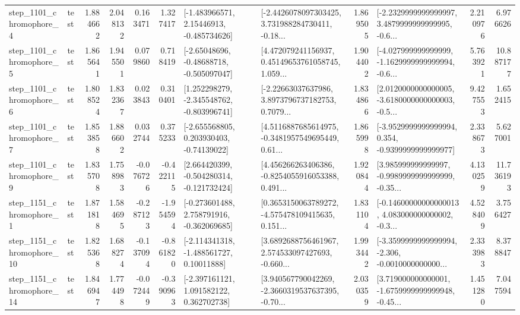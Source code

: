 \begin{tabular}{llrrrrllrlrr}
  step\_1101\_chromophore\_4 &      test &      1.884662 &    2.048132 &      0.163471 &  1.327417 &    [-1.483966571, 2.15446913, -0.485734626] &  [-2.4426078097303425, 3.731988284730411, -0.18... &       1.869505 &  [-2.2329999999999997, 3.4879999999999995, -0.6... &            2.210976 &          6.976626 \\
  step\_1101\_chromophore\_5 &      test &      1.865641 &    1.945501 &      0.079860 &  0.718419 &    [-2.65048696, -0.48688718, -0.505097047] &  [4.472079241156937, 0.45149653761058745, 1.059... &       1.904402 &  [-4.027999999999999, -1.1629999999999994, -0.6... &            5.763921 &         10.887177 \\
  step\_1101\_chromophore\_6 &      test &      1.808524 &    1.832367 &      0.023843 &  0.310401 &   [1.252298279, -2.345548762, -0.803996741] &  [-2.22663037637986, 3.8973796737182753, 0.7079... &       1.834866 &  [2.0120000000000005, -3.6180000000000003, -0.5... &            9.427553 &          1.652415 \\
  step\_1101\_chromophore\_7 &      test &      1.853858 &    1.886602 &      0.032744 &  0.375233 &    [-2.655568805, 0.203930403, -0.74139022] &  [4.5116887685614975, -0.3481957549695449, 0.61... &       1.865998 &  [-3.9529999999999994, 0.354, -0.9399999999999977] &            2.338673 &          5.627001 \\
  step\_1101\_chromophore\_9 &      test &      1.835708 &    1.758983 &     -0.076726 & -0.422115 &   [2.664420399, -0.504280314, -0.121732424] &  [4.456266263406386, -0.8254055916053388, 0.491... &       1.920844 &  [3.985999999999997, -0.9989999999999999, -0.35... &            4.130259 &         11.736193 \\
  step\_1151\_chromophore\_1 &      test &      1.871818 &    1.584695 &     -0.287123 & -1.954594 &   [-0.273601488, 2.758791916, -0.362069685] &  [0.3653150063789272, -4.575478109415635, 0.151... &       1.831104 &  [-0.14600000000000013, 4.083000000000002, -0.3... &            4.528409 &          3.756427 \\
 step\_1151\_chromophore\_10 &      test &      1.825368 &    1.688274 &     -0.137094 & -0.861820 &    [-2.114341318, -1.488561727, 0.10011888] &  [3.6892688756461967, 2.574533097427693, -0.660... &       1.993442 &  [-3.3599999999999994, -2.306, -0.0010000000000... &            2.333983 &          8.378847 \\
 step\_1151\_chromophore\_14 &      test &      1.846947 &    1.774498 &     -0.072449 & -0.390963 &    [-2.397161121, 1.091582122, 0.362702738] &  [3.940567790042269, -2.3660319537637395, -0.70... &       2.030359 &  [3.719000000000001, -1.6759999999999948, -0.45... &            1.451280 &          7.047594 \\

\end{tabular}
